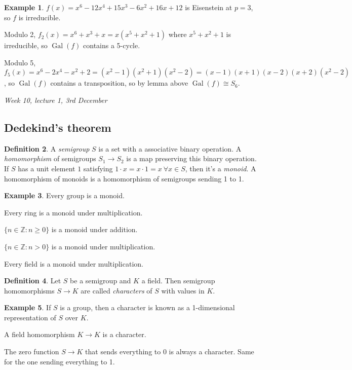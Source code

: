 \documentclass{article}
\newcommand{\Z}{\mathbb{Z}}
\newcommand{\Gal}{\operatorname{Gal}}
\theoremstyle{definition}
\newtheorem{defn}{Definition}[subsection]
\newtheorem{example}[defn]{Example}
\begin{document}
\begin{example}
$f(x)=x^6-12x^4+15x^3-6x^2+16x+12$ is Eisenstein at $p=3$, so $f$ is irreducible.

Modulo 2, $f_2(x)=x^6+x^3+x=x(x^5+x^2+1)$ where $x^5+x^2+1$ is irreducible, so $\Gal(f)$ contains a 5-cycle.

Modulo 5, $f_5(x)=x^6-2x^4-x^2+2=(x^2-1)(x^2+1)(x^2-2)=(x-1)(x+1)(x-2)(x+2)(x^2-2)$, so $\Gal(f)$ contains a transposition, so by lemma above $\Gal(f)\cong S_6$.
\end{example}

\begin{flushright}
\textit{Week 10, lecture 1, 3rd December}
\end{flushright}

\subsection{Dedekind's theorem}

\begin{defn}
A \textit{semigroup} $S$ is a set with a associative binary operation. A \textit{homomorphism} of semigroups $S_1\rightarrow S_2$ is a map preserving this binary operation. If $S$ has a unit element $1$ satisfying $1\cdot x=x\cdot 1=x\ \forall x\in S$, then it's a \textit{monoid}. A homomorphism of monoids is a homomorphism of semigroups sending 1 to 1.
\end{defn}

\begin{example}
Every group is a monoid.

Every ring is a monoid under multiplication.

$\{n\in\Z:n\geq 0\}$ is a monoid under addition.

$\{n\in\Z:n>0\}$ is a monoid under multiplication.

Every field is a monoid under multiplication.
\end{example}

\begin{defn}
Let $S$ be a semigroup and $K$ a field. Then semigroup homomorphisms $S\rightarrow K$ are called \textit{characters} of $S$  with values in $K$.
\end{defn}

\begin{example}
If $S$ is a group, then a character is known as a 1-dimensional representation of $S$ over $K$.

A field homomorphism $K\rightarrow K$ is a character.

The zero function $S\rightarrow K$ that sends everything to 0 is always a character. Same for the one sending everything to 1.
\end{example}
\end{document}
